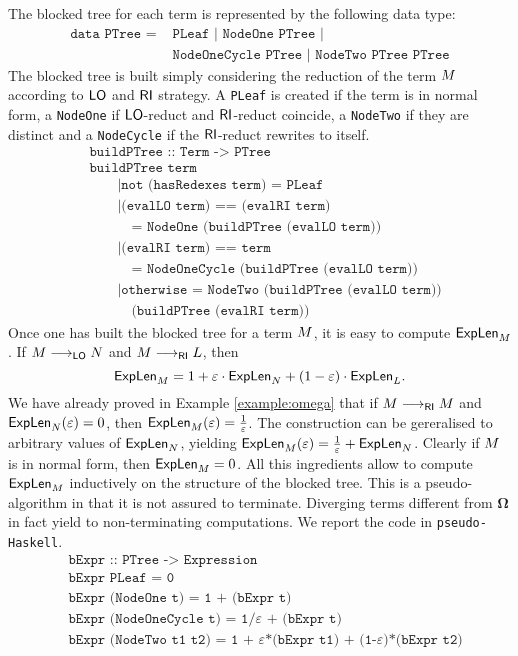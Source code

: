 The blocked tree for each term is represented by the following data type:
\begin{align*}
	\texttt{data PTree = }&\texttt{PLeaf | NodeOne PTree |}\\
	&\texttt{NodeOneCycle PTree | NodeTwo PTree PTree}
\end{align*}
The blocked tree is built simply considering the reduction of the term $M$ according to $\textsf{LO}$ and $\textsf{RI}$ strategy. A \texttt{PLeaf} is created if the term is in normal form, a \texttt{NodeOne} if $\textsf{LO}$-reduct and $\textsf{RI}$-reduct coincide, a \texttt{NodeTwo} if they are distinct and a \texttt{NodeCycle} if the $\textsf{RI}$-reduct rewrites to itself.
\begin{align*}
&\texttt{buildPTree :: Term -> PTree}\\
&\texttt{buildPTree term}\\
&\qquad\texttt{|not (hasRedexes term) = PLeaf}\\
&\qquad\texttt{|(evalLO term) == (evalRI term)}\\
&\quad\qquad\texttt{= NodeOne (buildPTree (evalLO term))}\\
&\qquad\texttt{|(evalRI term) == term}\\
&\qquad\quad\texttt{= NodeOneCycle (buildPTree (evalLO term))}\\
&\qquad\texttt{|otherwise = NodeTwo (buildPTree (evalLO term))}\\
&\qquad\quad\texttt{(buildPTree (evalRI term))}
\end{align*}
Once one has built the blocked tree for a term $M$, it is easy to compute $\textsf{ExpLen}_{M}$. If $M\longrightarrow_{\textsf{LO}}N$ and $M\longrightarrow_{\textsf{RI}}L$, then
$$
\textsf{ExpLen}_{M}=1+\varepsilon\cdot\textsf{ExpLen}_{N}+(1-\varepsilon)\cdot\textsf{ExpLen}_{L}.
$$
We have already proved in Example \ref{example:omega} that if $M\longrightarrow_{\textsf{RI}}M$ and $\textsf{ExpLen}_{N}(\varepsilon)=0$, then $\textsf{ExpLen}_{M}(\varepsilon)=\frac{1}{\varepsilon}$. The construction can be gereralised to arbitrary values of $\textsf{ExpLen}_{N}$, yielding $\textsf{ExpLen}_{M}(\varepsilon)=\frac{1}{\varepsilon}+\textsf{ExpLen}_{N}$. Clearly if $M$ is in normal form, then $\textsf{ExpLen}_{M}=0$. All this ingredients allow to compute $\textsf{ExpLen}_{M}$ inductively on the structure of the blocked tree. This is a pseudo-algorithm in that it is not assured to terminate. Diverging terms different from $\bm{\Omega}$ in fact yield to non-terminating computations. We report the code in \texttt{pseudo-Haskell}.
\begin{align*}
&\texttt{bExpr :: PTree -> Expression}\\
&\texttt{bExpr PLeaf = 0}\\
&\texttt{bExpr (NodeOne t) = 1 + (bExpr t)}\\
&\texttt{bExpr (NodeOneCycle t) = 1/}\varepsilon\texttt{ + (bExpr t)}\\
&\texttt{bExpr (NodeTwo t1 t2) = 1 + }\varepsilon\texttt{*(bExpr t1) + (1-}\varepsilon\texttt{)*(bExpr t2)}
\end{align*}

